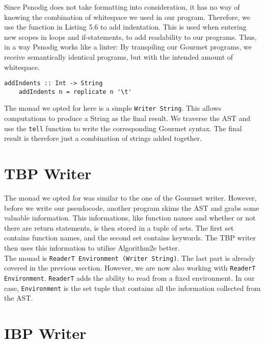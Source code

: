 Since Psnodig does not take formatting into consideration, it has no way of knowing the combination of whitespace we used in our program. Therefore, we use the function in Listing 5.6 to add indentation. This is used when entering new scopes in loops and if-statements, to add readability to our programs. Thus, in a way Psnodig works like a linter: By transpiling our Gourmet programs, we receive semantically identical programs, but with the intended amount of whitespace. \hfill \\

\begin{lstlisting}[caption={A function for adding indentation}, captionpos=b, frame=trbl]
    addIndents :: Int -> String
    addIndents n = replicate n '\t'
\end{lstlisting}

The monad we opted for here is a simple \texttt{Writer String}. This allows computations to produce a String as the final result. We traverse the AST and use the \texttt{tell} function to write the corresponding Gourmet syntax. The final result is therefore just a combination of strings added together.

\section{TBP Writer}

The monad we opted for was similar to the one of the Gourmet writer. However, before we write our pseudocode, another program skims the AST and grabs some valuable information. This informations, like function names and whether or not there are return statements, is then stored in a tuple of sets. The first set contains function names, and the second set contains keywords. The TBP writer then uses this information to utilise Algorithm2e better. \hfill \\

The monad is \texttt{ReaderT Environment (Writer String)}. The last part is already covered in the previous section. However, we are now also working with \texttt{ReaderT Environment}. \texttt{ReaderT} adds the ability to read from a fixed environment. In our case, \texttt{Environment} is the set tuple that contains all the information collected from the AST.

\section{IBP Writer}

